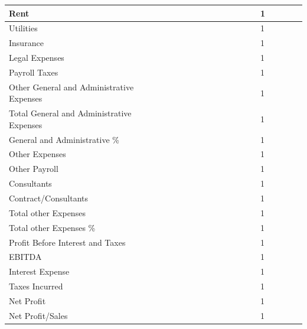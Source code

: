 \documentclass[11pt,titlepage]{article}
\begin{document}
\begin{landscape}
\begin{scriptsize}
\begin{tabular}{ | l | l | l | l | l | l | l | l | l | l | l | l | l | l | l | l | l | l |}
  Rent & & & & & & & & & & & & & 1 \\ \hline
  Utilities & & & & & & & & & & & & & 1 \\ \hline
  Insurance & & & & & & & & & & & & & 1 \\ \hline
  Legal Expenses & & & & & & & & & & & & & 1 \\ \hline
  Payroll Taxes & & & & & & & & & & & & & 1 \\ \hline
  Other General and Administrative Expenses & & & & & & & & & & & & & 1 \\ \hline
  Total General and Administrative Expenses & & & & & & & & & & & & & 1 \\ \hline
  General and Administrative \% & & & & & & & & & & & & & 1 \\ \hline
  Other Expenses & & & & & & & & & & & & & 1 \\ \hline
  Other Payroll & & & & & & & & & & & & & 1 \\ \hline
  Consultants & & & & & & & & & & & & & 1 \\ \hline
  Contract/Consultants & & & & & & & & & & & & & 1 \\ \hline
  Total other Expenses & & & & & & & & & & & & & 1 \\ \hline
  Total other Expenses \% & & & & & & & & & & & & & 1 \\ \hline
  Profit Before Interest and Taxes & & & & & & & & & & & & & 1 \\ \hline
  EBITDA & & & & & & & & & & & & & 1 \\ \hline
  Interest Expense & & & & & & & & & & & & & 1 \\ \hline
  Taxes Incurred & & & & & & & & & & & & & 1 \\ \hline
  Net Profit & & & & & & & & & & & & & 1 \\ \hline
  Net Profit/Sales & & & & & & & & & & & & & 1 \\ \hline
\end{tabular}
\end{scriptsize}
\end{landscape}
\newpage
\thispagestyle{empty}
\end{document}
